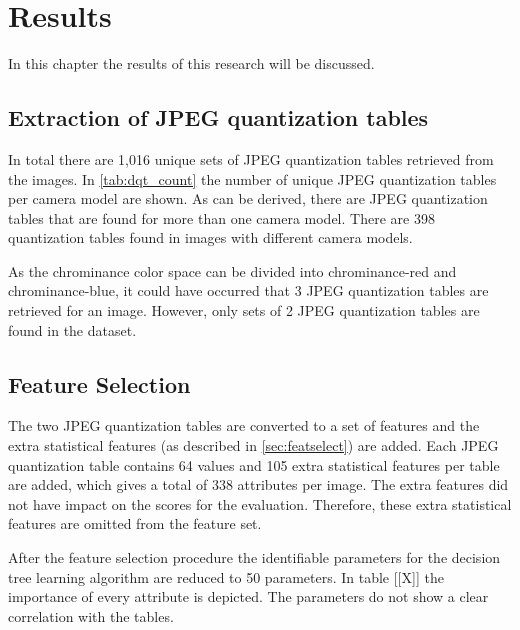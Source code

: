 
\chapter{Results} %

\label{ch:results} %

In this chapter the results of this research will be discussed. %

\section{Extraction of JPEG quantization tables}
In total there are 1,016 unique sets of JPEG quantization tables retrieved from the images. In \autoref{tab:dqt_count} the number of unique JPEG quantization tables per camera model are shown. As can be derived, there are JPEG quantization tables that are found for more than one camera model. There are 398 quantization tables found in images with different camera models. 

As the chrominance color space can be divided into chrominance-red and chrominance-blue, it could have occurred that 3 JPEG quantization tables are retrieved for an image. However, only sets of 2 JPEG quantization tables are found in the dataset.

\section{Feature Selection}
The two JPEG quantization tables are converted to a set of features and the extra statistical features (as described in \autoref{sec:featselect}) are added. Each JPEG quantization table contains 64 values and 105 extra statistical features per table are added, which gives a total of 338 attributes per image. The extra features did not have impact on the scores for the evaluation. Therefore, these extra statistical features are omitted from the feature set.

After the feature selection procedure the identifiable parameters for the decision tree learning algorithm are reduced to 50 parameters. In table [[X]] the importance of every attribute is depicted. The parameters do not show a clear correlation with the tables. 



